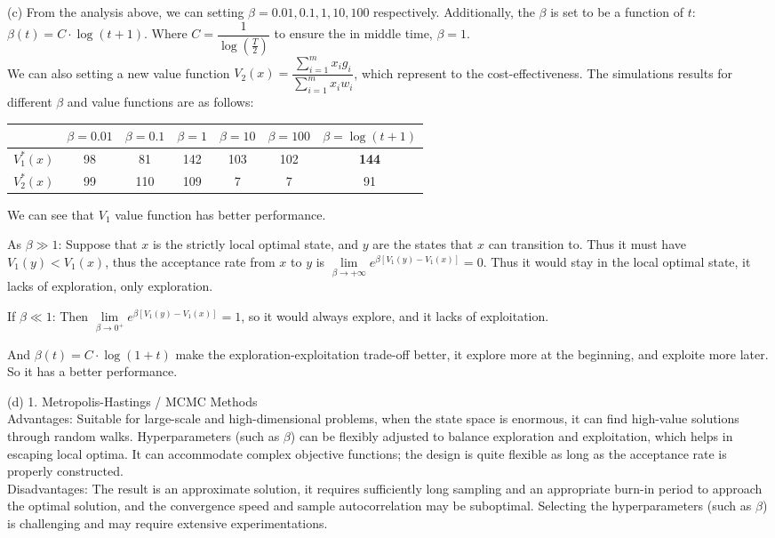 \begin{homeworkProblem}
(c) From the analysis above, we can setting $\beta = 0.01, 0.1, 1, 10, 100$ respectively. Additionally, the $\beta$ is set to be a function of $t$: $\beta(t)=C\cdot \log(t+1)$. Where $C=\dfrac{1}{\log\left(\frac{T}{2}\right)}$ to ensure the in middle time, $\beta=1$. \\
We can also setting a new value function $V_2(x)=\dfrac{\sum_{i=1}^m x_ig_i}{\sum_{i=1}^m x_iw_i}$, which represent to the cost-effectiveness. The simulations results for different $\beta$ and value functions are as follows: \\

\begin{table}[h]
    \centering
    \label{tab:value_function}
    \begin{tabular}{l c c c c c c}
    \toprule
    & $\beta=0.01$ & $\beta=0.1$ & $\beta=1$ & $\beta=10$ & $\beta=100$ & $\beta=\log(t+1)$ \\
    \midrule
    $V_1^*(x)$ & 98 & 81 & 142 & 103 & 102 & \textbf{144} \\
    $V_2^*(x)$ & 99 & 110 & 109 & 7 & 7 & 91 \\
    \bottomrule
\end{tabular}
\end{table}

We can see that $V_1$ value function has better performance.

As $\beta\gg 1$: Suppose that $x$ is the strictly local optimal state, and $y$ are the states that $x$ can transition to. Thus it must have $V_1(y)<V_1(x)$, thus the acceptance rate from $x$ to $y$ is $\lim\limits_{\beta\to+\infty}e^{\beta\left[V_1(y)-V_1(x)\right]}=0$. Thus it would stay in the local optimal state, it lacks of exploration, only exploration.

If $\beta\ll 1$: Then $\lim\limits_{\beta\to 0^+}e^{\beta\left[V_1(y)-V_1(x)\right]}=1$, so it would always explore, and it lacks of exploitation.


And $\beta(t)=C\cdot \log(1+t)$ make the exploration-exploitation trade-off better, it explore more at the beginning, and exploite more later. So it has a better performance.

(d) 1. Metropolis-Hastings / MCMC Methods \\
Advantages:
Suitable for large-scale and high-dimensional problems, when the state space is enormous, it can find high-value solutions through random walks. Hyperparameters (such as $\beta$) can be flexibly adjusted to balance exploration and exploitation, which helps in escaping local optima. It can accommodate complex objective functions; the design is quite flexible as long as the acceptance rate is properly constructed. \\
Disadvantages: The result is an approximate solution, it requires sufficiently long sampling and an appropriate burn-in period to approach the optimal solution, and the convergence speed and sample autocorrelation may be suboptimal. Selecting the hyperparameters (such as $\beta$) is challenging and may require extensive experimentations.


\end{homeworkProblem}
